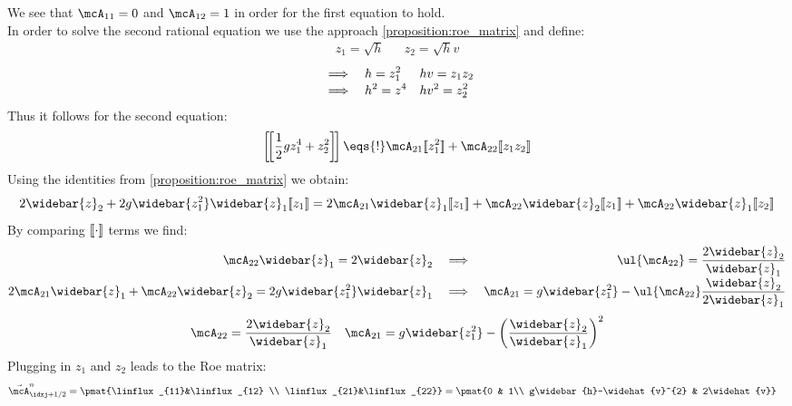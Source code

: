 \begin{examplebox}
\begin{example}
        We see that $\linflux_{11}=0$ and $\linflux_{12}=1$ in order for the first equation to hold.\\
        In order to solve the second rational equation we use the approach \cref{proposition:roe_matrix} and define:
        \begin{align*}
          z_{1}=\sqrt{h}&&z_{2}=\sqrt{h}v
        \end{align*}
        \begin{align*}
          &\implies&& h=z_{1}^{2}&&hv=z_{1}z_{2} \\[-1\jot]
          &\implies&& h^{2}=z^{4}&&hv^{2}=z_{2}^{2}
        \end{align*}
        Thus it follows for the second equation:
        \begin{align*}
         \left[\!\left[\frac{1}{2}gz_{1}^{4}+z_{2}^{2}\right]\!\right]\eqs{!}\linflux_{21}\dbracket{z_{1}^{2}} + \linflux_{22}\dbracket{z_{1}z_{2}}
        \end{align*}
        Using the identities from \cref{proposition:roe_matrix} we obtain:
        \begin{align*}
          2\widebar{z}_{2}+2g\widebar{z_{1}^{2}}\widebar{z}_{1}\dbracket{z_{1}}
          =2\linflux_{21}\widebar{z}_{1}\dbracket{z_{1}}+\linflux_{22}\widebar{z}_{2}\dbracket{z_{1}}+\linflux_{22}\widebar{z}_{1}\dbracket{z_{2}}
        \end{align*}
        By comparing $[\![\cdot]\!]$ terms we find:
       \begin{align*}
         \linflux_{22}\widebar{z}_{1}=2\widebar{z}_{2}&&\implies&&\ul{\linflux_{22}}=\frac{2\widebar{z}_{2}}{\widebar{z}_{1}}\\[-1\jot]
        2\linflux_{21}\widebar{z}_{1}+\linflux_{22}\widebar{z}_{2}=2g\widebar{z_{1}^{2}}\widebar{z}_{1}
         &&\implies&&\linflux_{21}=g\widebar{z_{1}^{2}}-\ul{\linflux_{22}}\frac{\widebar{z}_{2}}{2\widebar{z}_{1}}
       \end{align*}
       \begin{align*}
         \linflux_{22}=\frac{2\widebar{z}_{2}}{\widebar{z}_{1}}&&\linflux_{21}=g\widebar{z_{1}^{2}}-\left(\frac{\widebar{z}_{2}}{\widebar{z}_{1}}\right)^{2}
       \end{align*}
       Plugging in $z_{1}$ and $z_{2}$ leads to the Roe matrix:
       \begin{align}
         \linfluxvec_{\idxj+1/2}^{n}=\pmat{\linflux_{11}&\linflux_{12} \\ \linflux_{21}&\linflux_{22}}=
                                                                                         \pmat{0 & 1\\ g\widebar{h}-\widehat{v}^{2} & 2\widehat{v}}&&

\end{align}
\end{example}
\end{examplebox}
